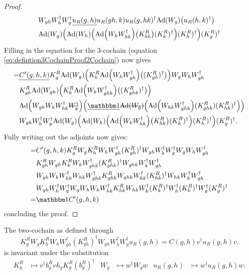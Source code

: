 \documentclass[11pt,a4paper,twoside]{article}
\numberwithin{equation}{section}
\begin{document}
\begin{proof}
\begin{align}
			\nonumber
			&W_{gh}W_h^\dagger W_g^\dagger \underline{u_R(g,h)} u_R(gh,k)u_R(g,hk)^\dagger\Ad{W_g}\left(u_R(h,k)^\dagger\right)\\
			\nonumber
			&\Ad{W_g}\left(\Ad{W_h}\left(\Ad{W_kW_{hk}^\dagger}\left(K_{hk}^R\right)(K^R_k)^\dagger\right)(K^R_h)^\dagger\right)(K^R_g)^\dagger
		\end{align}
		Filling in the equation for the 3-cochain (equation \eqref{eq:defintion3CochainProof2Cochain}) now gives
		\begin{align}
			=&\underline{C'(g,h,k)}K_g^R\Ad{W_g}\left(K_h^R\Ad{W_hW_{gh}^\dagger}\left((K_{gh}^R)^\dagger\right)\right)W_gW_hW_{gh}^\dagger \\
			\nonumber
			&K_{gh}^R\Ad{W_{gh}}\left(K_k^R\Ad{W_kW_{ghk}^\dagger}\left((K_{ghk}^R)^\dagger\right)\right)\\
			\nonumber
			&\Ad{W_{gh}W_kW_{hk}^\dagger \stkout{W_{g}^\dagger}}  \left(\underline{\id}\stkout{\Ad{W_g}}\left( \Ad{W_{hk}W_{ghk}^\dagger}(K^R_{ghk})(K^R_{hk})^{\dagger} \right)\right)\\
			\nonumber
			&W_{gh}W_h^\dagger W_g^\dagger\Ad{W_g}\left(\Ad{W_h}\left(\Ad{W_kW_{hk}^\dagger}\left(K_{hk}^R\right)(K^R_k)^\dagger\right)(K^R_h)^\dagger\right)(K^R_g)^\dagger.
		\end{align}
		Fully writing out the adjoints now gives:
		\begin{align}
			=&C'(g,h,k)K_g^RW_gK_h^RW_hW_{gh}^\dagger (K_{gh}^R)^\dagger W_{gh}W_h^\dagger W_g^\dagger W_gW_hW_{gh}^\dagger \\
			\nonumber
			&K_{gh}^RW_{gh}K_k^RW_kW_{ghk}^\dagger(K_{ghk}^R)^\dagger W_{ghk}W_k^\dagger W_{gh}^\dagger  \\
			\nonumber
			&W_{gh}W_kW_{hk}^\dagger W_{hk}W_{ghk}^\dagger K^R_{ghk} W_{ghk}W_{hk}^\dagger(K^R_{hk})^{\dagger} W_{hk}W_k^\dagger W_{gh}^\dagger\\
			\nonumber
			&W_{gh}W_h^\dagger W_g^\dagger W_gW_h W_kW_{hk}^\dagger K_{hk}^RW_{hk}W_k^\dagger(K^R_k)^\dagger W_h^\dagger (K^R_h)^\dagger W_g^\dagger (K^R_g)^\dagger\\
			=&\id C'(g,h,k)
		\end{align}
		concluding the proof.
	\end{proof}
	\begin{lemma}\label{lem:2cochainIsInvariant}
		The two-cochain as defined through
		\begin{equation}\label{eq:Definition2Cochain2TranslationSectionAppendix}
			K_g^RW_gK_h^RW_hW_{gh}^\dagger(K_{gh}^R)^\dagger W_{gh}W_{h}^\dagger W_g^\dagger u_R(g,h)=C(g,h)v^\dagger u_R(g,h)v.
		\end{equation}
		is invariant under the substitution
		\begin{align}
			K_g^R&\mapsto v^\dagger b_g^R v h_g K_g^R (b_g^R)^\dagger&W_g&\mapsto w^\dagger W_g w&u_R(g,h)&\mapsto w^\dagger u_R(g,h)w.
		\end{align}
	\end{lemma}
\end{document}
